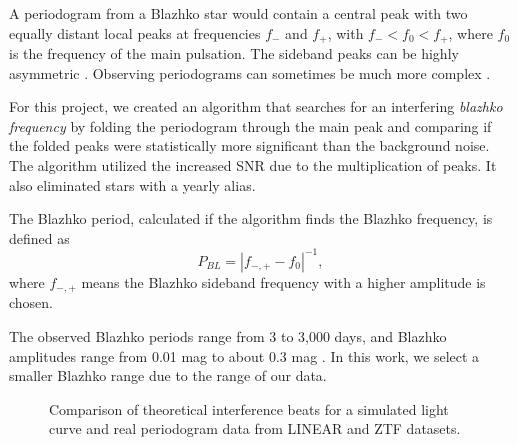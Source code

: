 \documentclass{aa}
\begin{document}
A periodogram from a Blazhko star would contain a central peak with two equally distant local peaks at frequencies $f_-$ and $f_+$, with $f_- < f_0 < f_+$, where $f_0$ is the frequency of the main pulsation. The sideband peaks can be highly asymmetric
\cite{2003ApJ...598..597A}. Observing periodograms can sometimes be much more complex \cite{2007MNRAS.377.1263S}.  

For this project, we created an algorithm that searches for an interfering \textit{blazhko frequency} by folding the periodogram through the main peak and comparing if the folded peaks were statistically more significant than the background noise. The algorithm utilized the increased SNR due to the multiplication of peaks. It also eliminated stars with a yearly alias.

The Blazhko period, calculated if the algorithm finds the Blazhko frequency, is defined as
\begin{equation*}
P_{BL} = |f_{-,+} - f_0|^{-1},
\end{equation*}
where $f_{-,+}$ means the Blazhko sideband frequency with a higher amplitude is chosen. 

The observed Blazhko periods range from 3 to 3,000 days, and Blazhko amplitudes range from 0.01 mag to about 0.3 mag \citep{2007MNRAS.377.1263S}. In this work, we select a smaller Blazhko range due to the range of our data.
\begin{figure}
  \centering
       \caption{Comparison of theoretical interference beats for a simulated light curve and real periodogram data from LINEAR and ZTF datasets.}
       \label{fig:periodogram}
  \end{figure}
\end{document}
